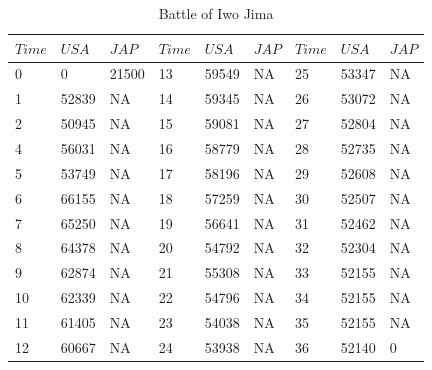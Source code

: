 \documentclass[]{article}
\begin{document}
\begin{table}
 

\tiny
\caption{Battle of Iwo Jima\\}
\vspace{0.5cm}
\tiny

{\begin{tabular}{|p{.5cm}|p{.5cm}|p{.5cm}|p{.5cm}|p{.5cm}|p{.5cm}|p{.5cm}|p{.5cm}|p{.5cm}|} 
\hline
\centering

$Time$ & $USA$ & $JAP$	& $Time$	& $USA$ & $JAP$	& $Time$ & $USA$	& $JAP$ \\
\hline  	
0&0&21500&13&59549&NA&25&53347&NA\\
\hline
1&	52839&	NA	&14	&59345&	NA&	26	&53072&	NA\\
\hline
2&	50945&	NA	&15&	59081&	NA&	27&	52804&	NA\\
\hline
4&	56031&	NA&	16&	58779	&NA	&28	&52735	&NA\\
\hline
5&	53749&	NA	&17&	58196&	NA&	29&	52608&	NA\\
\hline
6&	66155&	NA&	18&	57259	&NA&	30&	52507&	NA\\
\hline
7&	65250&	NA&	19&	56641&	NA&	31&	52462&	NA\\
\hline
8&	64378&	NA&	20&	54792&	NA&	32&	52304&	NA\\
\hline
9&	62874&	NA&	21&	55308&	NA&	33&	52155&	NA\\
\hline
10&	62339&	NA&	22&	54796&	NA&	34&	52155&	NA\\
\hline
11&	61405&	NA&	23&	54038&	NA&	35&	52155&	NA\\
\hline
12&	60667&	NA&	24&	53938&	NA&	36&	52140&	0\\
\hline

\end{tabular}}%
\tiny
\end{table}
\end{document}

